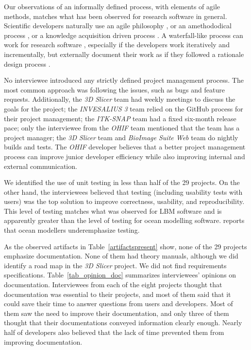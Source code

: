 \documentclass[final, 12pt, 3p, times]{elsarticle}
\begin{document}
Our observations of an informally defined process, with elements of agile
methods, matches what has been observed for research software in general.
Scientific developers naturally use an agile philosophy \cite{AckroydEtAl2008,
CarverEtAl2007, EasterbrookAndJohns2009, Segal2005, HeatonAndCarver2015}, or an
amethododical process \cite{Kelly2013}, or a knowledge acquisition driven
process \cite{Kelly2015}.  A waterfall-like process can work for research
software \cite{Smith2016}, especially if the developers work iteratively and
incrementally, but externally document their work as if they followed a
rationale design process \cite{parnas1986rational}.

No interviewee introduced any strictly defined project management process. The
most common approach was following the issues, such as bugs and feature
requests. Additionally, the \textit{3D Slicer} team had weekly meetings to
discuss the goals for the project; the \textit{INVESALIUS 3} team relied on the
GitHub process for their project management; the \textit{ITK-SNAP} team had a
fixed six-month release pace; only the interviewee from the \textit{OHIF} team
mentioned that the team has a project manager; the \textit{3D Slicer} team and
\textit{BioImage Suite Web} team do nightly builds and tests. The \textit{OHIF}
developer believes that a better project management process can improve junior
developer efficiency while also improving internal and external communication.

We identified the use of unit testing in less than half of the 29 projects. On
the other hand, the interviewees believed that testing (including usability
tests with users) was the top solution to improve correctness, usability, and
reproducibility.  This level of testing matches what was observed for LBM
software \cite{Michalski2021} and is apparently greater than the level of
testing for ocean modelling software.  \cite{JungEtAl2022} reports that ocean
modellers underemphasize testing.

As the observed artifacts in Table~\ref{artifactspresent} show, none of the 29
projects emphasize documentation. None of them had theory manuals, although we
did identify a road map in the \textit{3D Slicer} project.  We did not find
requirements specifications. Table~\ref{tab_opinion_doc} summarizes
interviewees' opinions on documentation. Interviewees from each of the eight
projects thought that documentation was essential to their projects, and most of
them said that it could save their time to answer questions from users and
developers. Most of them saw the need to improve their documentation, and only
three of them thought that their documentations conveyed information clearly
enough. Nearly half of developers also believed that the lack of time prevented
them from improving documentation.
\end{document}
